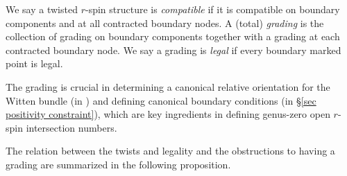 \documentclass[11pt]{amsart}
\theoremstyle{definition}
\theoremstyle{remark}
\newcommand{\<}{\left<}
\renewcommand{\>}{\right>}
\numberwithin{equation}{section}
\begin{document}
We say a twisted $r$-spin structure is \textit{compatible} if it is compatible on boundary components and at all contracted boundary nodes.  A (total) \textit{grading} is the collection of grading on boundary components together with a grading at each contracted boundary node. We say a grading is \textit{legal} if every boundary marked point is legal.


The grading is crucial in determining a canonical relative orientation for the Witten bundle (in \cite{TZ1}) and defining canonical boundary conditions (in \S \ref{sec positivity constraint}), which are key ingredients in defining genus-zero open $r$-spin intersection numbers.




The relation between the twists %
and legality and %
the obstructions to having %
a grading are %
summarized in the following %
proposition.
\end{document}
